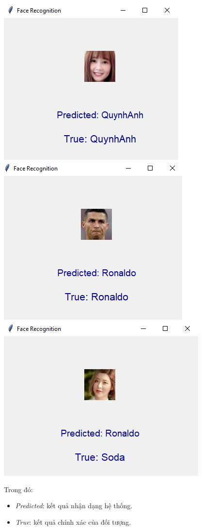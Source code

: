 \documentclass[12pt,a4paper]{article}
\begin{document}
\begin{center}
\includegraphics[scale=0.7]{4.png}\\
\includegraphics[scale=0.7]{5.png}\\
\includegraphics[scale=0.7]{6.png}\\
\end{center} 
Trong đó: 
\begin{itemize}
\item \textit{Predicted}: kết quả nhận dạng hệ thống.
\item \textit{True}: kết quả chính xác của đối tượng.
\end{itemize}   
\end{document}

